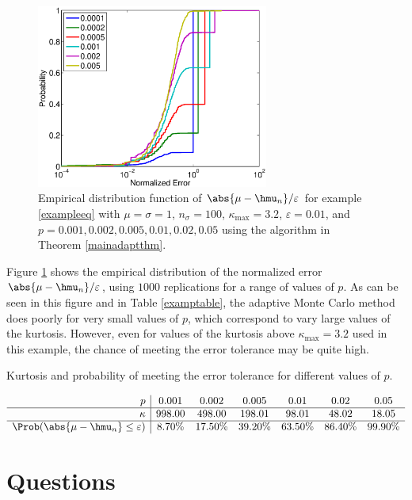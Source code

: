 \documentclass[graybox]{svmult}
\begin{document}
\begin{figure}
\includegraphics[width=3in]{NormalErrFig.eps}
\caption{Empirical distribution function of $\abs{\mu-\hmu_n}/\varepsilon$ for example \eqref{exampleeq} with $\mu=\sigma=1$, $n_{\sigma}=100$, $\kappa_{\max} = 3.2$, $\varepsilon=0.01$, and  $p=0.001, 0.002, 0.005, 0.01, 0.02, 0.05$ using the algorithm in Theorem \ref{mainadaptthm}. \label{normalerrfig}}
\end{figure}

Figure \ref{normalerrfig} shows the empirical distribution of the normalized error $\abs{\mu-\hmu_n}/\varepsilon$, using $1000$ replications for a range of values of $p$.  As can be seen in this figure and in Table \ref{examptable}, the adaptive Monte Carlo method does poorly for very small values of $p$, which correspond to vary large values of the kurtosis.  However, even for values of the kurtosis above $\kappa_{\max}=3.2$ used in this example, the chance of meeting the error tolerance may be quite high.

\begin{table}
\caption{Kurtosis and probability of meeting the error tolerance for different values of $p$. \label{examptable}}
\[
\begin{array}{r|ccccccccccc}
p &   0.001 &    0.002 &    0.005 &     0.01 &     0.02 &     0.05 \\
\hline
\kappa &  998.00 &   498.00 &   198.01 &    98.01 &    48.02 &    18.05 \\
\hline
\Prob(\abs{\mu-\hmu_n} \le \varepsilon) &    8.70\% &    17.50\% &    39.20\% &    63.50\% &    86.40\% &    99.90\% \\
\end{array}
\]
\end{table}


\section{Questions}
\end{document}
